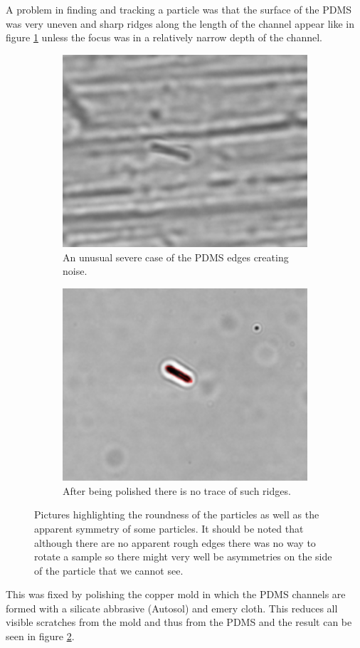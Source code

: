 A problem in finding and tracking a particle was that the surface of the PDMS was very uneven and sharp ridges along the length of the channel appear like in figure \ref{fig:unpolished} unless the focus was in a relatively narrow depth of the channel. 
 
 \begin{figure}[H]
 \centering
 \begin{subfigure}[3a]{0.40\textwidth}
 \includegraphics[width=\textwidth]{figures/improvements/unpolished.png}
 \caption{An unusual severe case of the PDMS edges creating noise.}\label{fig:unpolished}
 \end{subfigure}\hspace{1em}%
 \begin{subfigure}[3b]{0.40\textwidth}
 \includegraphics[width=\textwidth]{figures/improvements/polished.png}
 \caption{After being polished there is no trace of such ridges.}\label{fig:polished}
 \end{subfigure}
 \caption{Pictures highlighting the roundness of the particles as well as the apparent symmetry of some particles. It should be noted that although there are no apparent rough edges there was no way to rotate a sample so there might very well be asymmetries on the side of the particle that we cannot see.}
 \label{fig:polisheffect}
 \end{figure}
 

This was fixed by polishing the copper mold in which the PDMS channels are formed with a silicate abbrasive (Autosol) and emery cloth. This reduces all visible scratches from the mold and thus from the PDMS and the result can be seen in figure \ref{fig:polished}.

